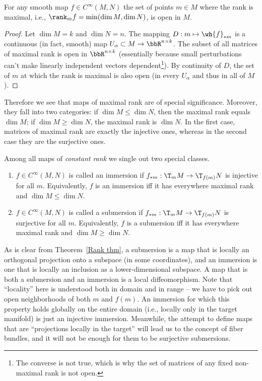 \begin{prop}\label{domain of maximal rank}
    For any smooth map $f\in C^\infty (M,N)$ the set of points $m\in M$ where the rank is maximal, i.e., $\rank_m f=\min(\dim M,\dim N)$, is open in $M$.
\end{prop}
\begin{proof}
    Let $\dim M=k$ and $\dim N=n$. The mapping $D:m\mapsto \wh{f}_{\ast m}$ is a continuous (in fact, smooth) map $U_\alpha\subset M\to \bbR^{n\times k}$. The subset of all matrices of maximal rank is open in $\bbR^{n\times k}$ (essentially because small perturbations can't make linearly independent vectors dependent\footnote{The converse is not true, which is why the set of matrices of any fixed non-maximal rank is not open.}). By continuity of $D$, the set of $m$ at which the rank is maximal is also open (in every $U_\alpha$ and thus in all of $M$).
\end{proof}

Therefore we see that maps of maximal rank are of special significance. Moreover, they fall into two categories: if $\dim M\leq \dim N$, then the maximal rank equals $\dim M$; if $\dim M\geq \dim N$, the maximal rank is $\dim N$. In the first case, matrices of maximal rank are exactly the injective ones, whereas in the second case they are the surjective ones.

\begin{defn}\label{def immersion submersion}
    Among all maps of \emph{constant rank} we single out two special classes.
\begin{enumerate}
    \item $f\in C^\infty(M,N)$ is called an immersion if $f_{\ast m}:\T_m  M\to \T_{f(m)} N$ is injective for all $m$. Equivalently, $f$ is an immersion iff it has everywhere maximal rank and $\dim M\leq \dim N$.
    \item $f\in C^\infty(M,N)$ is called a submersion if $f_{\ast m}:\T_m  M\to \T_{f(m)} N$ is surjective for all $m$. Equivalently, $f$ is a submersion iff it has everywhere maximal rank and $\dim M\geq \dim N$.
\end{enumerate}
\end{defn}

\begin{rem}
    As is clear from Theorem~\ref{Rank thm}, a submersion is a map that is locally an orthogonal projection onto a subspace (in some coordinates), and an immersion is one that is locally an inclusion as a lower-dimensional subspace. A map that is both a submersion and an immersion is a local diffeomorphism. Note that ``locality'' here is understood both in domain and in range -- we have to pick out open neighborhoods of both $m$ and $f(m)$. An immersion for which this property holds globally on the entire domain (i.e., locally only in the target manifold) is just an injective immersion. Meanwhile, the attempt to define maps that are ``projections locally in the target'' will lead us to the concept of fiber bundles, and it will not be enough for them to be surjective submersions.
\end{rem}


